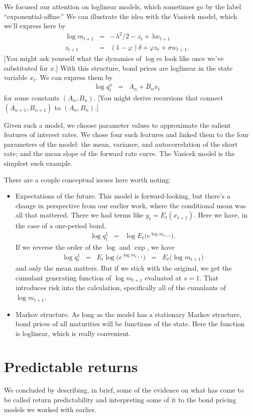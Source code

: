 \documentclass[11pt]{article}
\begin{document}
We focused our attention on loglinear models,
which sometimes go by the label ``exponential-affine.''
We can illustrate the idea with the Vasicek model,
which we'll express here by
\begin{eqnarray*}
    \log m_{t+1} &=& - \lambda^2/2 - z_t + \lambda w_{t+1} \\
         z_{t+1} &=& (1-\varphi) \delta + \varphi z_t + \sigma w_{t+1} .
\end{eqnarray*}
[You might ask yourself what the dynamics of $\log m$ look like once
we've substituted for $x$.]
With this structure, bond prices are loglinear in the state variable $x_t$.
We can express them by
\begin{eqnarray*}
    \log q^n_t &=& A_n + B_n x_t
\end{eqnarray*}
for some constants $(A_n,B_n)$.
[You might derive recursions that connect
$(A_{n+1},B_{n+1})$ to $(A_n,B_n)$.]


Given such a model, we choose parameter values to approximate the
salient features of interest rates.
We chose four such features and linked them to the four parameters
of the model:
the mean, variance, and autocorrelation of the short rate;
and the mean slope of the forward rate curve.
The Vasicek model is the simplest such example.

There are a couple conceptual issues here worth noting:
%
\begin{itemize}

\item Expectations of the future.
This model is forward-looking, but there's a change in perspective from our earlier work,
where the conditional mean was all that mattered.
There we had terms like $y_t = E_t (x_{t+1}) $.
Here we have, in the case of a one-period bond,
\begin{eqnarray*}
    \log q^1_t &=& \log E_t \big( e^{\log m_{t+1}} \big) .
\end{eqnarray*}
If we reverse the order of the $\log$ and $\exp$, we have 
\begin{eqnarray*}
    \log q^1_t &=& E_t \log \big( e^{\log m_{t+1}} \big) 
            \;\;=\;\; E_t \big( {\log m_{t+1}} \big) 
\end{eqnarray*}
and only the mean matters.  
But if we stick with the original, 
we get the cumulant generating function of $\log m_{t+1}$
evaluated at $s=1$.
That introduces risk into the calculation, 
specifically all of the cumulants of $\log m_{t+1}$.  

\item Markov structure.
As long as the model has a stationary Markov structure,
bond prices of all maturities will be functions of the state.
Here the function is loglinear, which is really convenient.
\end{itemize}


\section{Predictable returns} 

We concluded by describing, in brief, some of the evidence on 
what has come to be called return predictability and 
interpreting some of it to the bond pricing models we worked with earlier.  



\end{document}
